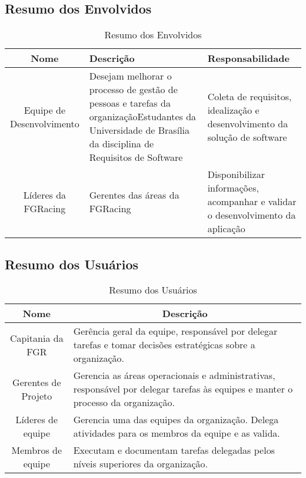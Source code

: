 \begin{apendicesenv}
\subsection{Resumo dos Envolvidos}
\begin{table}[!h]
  \centering
  \caption{Resumo dos Envolvidos}
  \begin{tabular}{|c|l|l|}
  \hline
  \textbf{Nome}             & \textbf{Descrição}                                                                                                                                      & \textbf{Responsabilidade}                                                       \\ \hline
  Equipe de Desenvolvimento & \parbox[t]{6cm}{Desejam melhorar o processo de gestão de pessoas e tarefas da organizaçãoEstudantes da Universidade de Brasília da disciplina de Requisitos de Software} & \parbox[t]{5cm}{Coleta de requisitos, idealização e desenvolvimento da solução de software}      \\ \hline
  Líderes da FGRacing       & Gerentes das áreas da FGRacing                                                                                                                          & \parbox[t]{5cm}{Disponibilizar informações, acompanhar e validar o desenvolvimento da aplicação} \\ \hline
  \end{tabular}
\end{table}

\subsection{Resumo dos Usuários}
\begin{table}[!h]
  \centering
  \caption{Resumo dos Usuários}
  \begin{tabular}{|c|l|}
  \hline
  \textbf{Nome}       & \multicolumn{1}{c|}{\textbf{Descrição}}                                                                                          \\ \hline
  Capitania da FGR    & \parbox[t]{11cm}{Gerência geral da equipe, responsável por delegar tarefas e tomar decisões estratégicas sobre a organização.}                     \\ \hline
  Gerentes de Projeto & \parbox[t]{11cm}{Gerencia as áreas operacionais e administrativas, responsável por delegar tarefas às equipes e manter o processo da organização.} \\ \hline
  Líderes de equipe   & \parbox[t]{11cm}{Gerencia uma das equipes da organização. Delega atividades para os membros da equipe e as valida.}                                \\ \hline
  Membros de equipe   & \parbox[t]{11cm}{Executam e documentam tarefas delegadas pelos níveis superiores da organização.}                                                  \\ \hline
  \end{tabular}
\end{table}


\end{apendicesenv}
